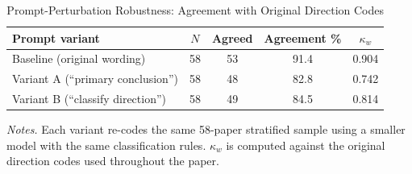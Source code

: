 \documentclass[12pt]{article}
\begin{document}
\begin{table}[H]
\centering
\caption{Prompt-Perturbation Robustness: Agreement with Original Direction Codes}
\label{tab:prompt_perturbation}
\begin{singlespace}
\small
\begin{tabular}{lcccc}
\toprule
Prompt variant & $N$ & Agreed & Agreement \% & $\kappa_w$ \\
\midrule
Baseline (original wording)        & 58 & 53 & 91.4 & 0.904 \\
Variant A (``primary conclusion'') & 58 & 48 & 82.8 & 0.742 \\
Variant B (``classify direction'') & 58 & 49 & 84.5 & 0.814 \\
\bottomrule
\end{tabular}
\par\smallskip
\begin{minipage}{0.85\textwidth}
\small
\textit{Notes.} Each variant re-codes the same 58-paper stratified sample
using a smaller model with the same classification rules.  $\kappa_w$ is
computed against the original direction codes used throughout the paper.
\end{minipage}
\end{singlespace}
\end{table}
\end{document}
